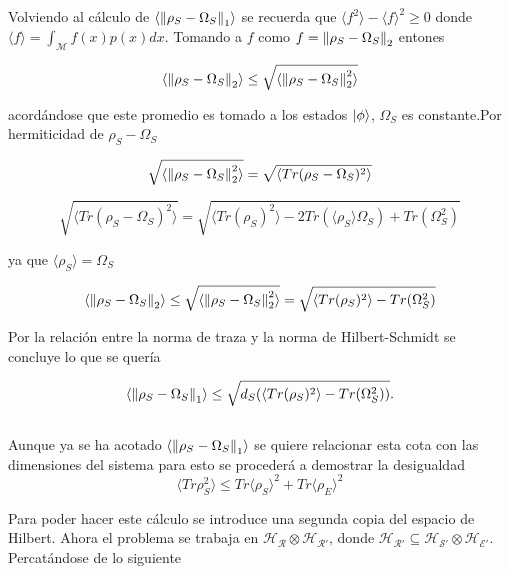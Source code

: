 Volviendo al cálculo de $\langle \norm{\rho_{S} -\Omega_{S}}_{1} \rangle$  se recuerda que $ \langle f^{2} \rangle-\langle f \rangle^{2} \ge 0$ donde $\langle f \rangle = \int_{\mathcal{M}} f(x)p(x)dx$. Tomando a $f$ como $f= \norm{\rho_{S}-\Omega_{S}}_{2}$ entones

\begin{equation}
\langle \norm{ \rho_{S}-\Omega_{S} }_{2} \rangle \le \sqrt{ \langle \norm{ \rho_{S}-\Omega_{S} }_{2}^{2}\rangle}
\end{equation}

acordándose que este promedio es tomado a los estados $\ket{\phi}$, $\Omega_{S}$ es constante.Por hermiticidad de $\rho_{S}-\Omega_{S}$ 

\begin{equation}
\sqrt{\langle \norm{ \rho_{S}-\Omega_{S} }_{2}^{2}\rangle} = \sqrt{\langle Tr(\rho_{S}-\Omega_{S})^{2} \rangle}
\end{equation}

\begin{equation}
\sqrt{\langle Tr( \rho_{S}-\Omega_{S})^{2} \rangle}= \sqrt{\langle Tr(\rho_{S})^{2}\rangle -2Tr(\langle \rho_{S} \rangle \Omega_{S})+Tr(\Omega_{S}^{2}) }
\end{equation}

ya que $\langle \rho_{S} \rangle=\Omega_{S}$

\begin{equation}
\langle \norm{ \rho_{S}-\Omega_{S} }_{2}\rangle \le \sqrt{\langle \norm{ \rho_{S}-\Omega_{S} }_{2}^{2}\rangle}= \sqrt{\langle Tr(\rho_{S})^{2}\rangle -Tr(\Omega_{S}^{2}) }
\end{equation}

Por la relación entre la norma de traza y la norma de Hilbert-Schmidt se concluye lo que se quería

\begin{equation}
\langle \norm{ \rho_{S}-\Omega_{S} }_{1}\rangle \le \sqrt{d_{S}( \langle Tr(\rho_{S})^{2}\rangle -Tr(\Omega_{S}^{2}) ) }.
\end{equation}
\\
Aunque ya se ha acotado $\langle \norm{ \rho_{S}-\Omega_{S} }_{1}\rangle$ se quiere relacionar esta cota con las dimensiones del sistema para esto se procederá a demostrar la desigualdad
\begin{equation}
\langle Tr \rho_{S}^{2} \rangle \le Tr \langle \rho_{S} \rangle^{2} +Tr \langle \rho_E \rangle^{2}
\end{equation}

Para poder hacer este cálculo se introduce una segunda copia del espacio de Hilbert. Ahora el problema se trabaja en $\mathcal{H_{R}} \otimes \mathcal{H_{R'}}$, donde $\mathcal{H_{R'}} \subseteq \mathcal{H_{S'} \otimes H_{E'}}$.
Percatándose de lo siguiente

